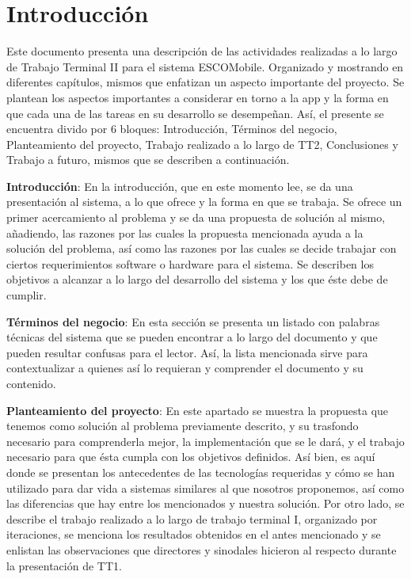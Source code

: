 \section{Introducción}

\noindent
Este documento presenta una descripción de las actividades realizadas a lo largo de Trabajo Terminal II para el sistema ESCOMobile. Organizado y mostrando en diferentes capítulos, mismos que enfatizan un aspecto importante del proyecto. Se plantean los aspectos importantes a considerar en torno a la app y la forma en que cada una de las tareas en su desarrollo se desempeñan. 
\newline
Así, el presente se encuentra divido por 6 bloques: Introducción, Términos del negocio, Planteamiento del proyecto, Trabajo realizado a lo largo de TT2, Conclusiones y Trabajo a futuro, mismos que se describen a continuación. 
\newline

\noindent
\textbf{Introducción}: En la introducción, que en este momento lee, se da una presentación al sistema, a lo que ofrece y la forma en que se trabaja. Se ofrece un primer acercamiento al problema y se da una propuesta de solución al mismo, añadiendo, las razones por las cuales la propuesta mencionada ayuda a la solución del problema, así como las razones por las cuales se decide trabajar con ciertos requerimientos software o hardware para el sistema. Se describen los objetivos a alcanzar a lo largo del desarrollo del sistema y los que éste debe de cumplir. 
\newline

\noindent
\textbf{Términos del negocio}: En esta sección se presenta un listado con palabras técnicas del sistema que se pueden encontrar a lo largo del documento y que pueden resultar confusas para el lector. Así, la lista mencionada sirve para contextualizar a quienes así lo requieran y comprender el documento y su contenido. 
\newline	

\noindent
\textbf{Planteamiento del proyecto}: En este apartado se muestra la propuesta que tenemos como solución al problema previamente descrito, y su trasfondo necesario para comprenderla mejor, la implementación que se le dará, y el trabajo necesario para que ésta cumpla con los objetivos definidos. Así bien, es aquí donde se presentan los antecedentes de las tecnologías requeridas y cómo se han utilizado para dar vida a sistemas similares al que nosotros proponemos, así como las diferencias que hay entre los mencionados y nuestra solución. Por otro lado, se describe el trabajo realizado a lo largo de trabajo terminal I, organizado por iteraciones, se menciona los resultados obtenidos en el antes mencionado y se enlistan las observaciones que directores y sinodales hicieron al respecto durante la presentación de TT1. 
\newline 

